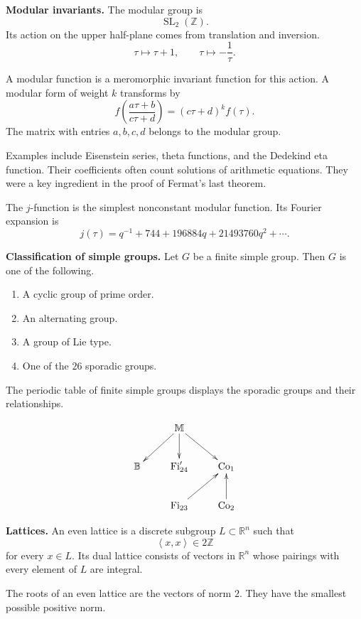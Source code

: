 \medskip\noindent
{\bf Modular invariants.}
The modular group is
$$
\operatorname{SL}_2(\mathbb{Z}).
$$
Its action on the upper half-plane comes from
translation and inversion.
$$
\tau\longmapsto\tau+1,
\qquad
\tau\longmapsto-\frac{1}{\tau}.
$$

A modular function is a meromorphic invariant
function for this action. A modular form of
weight $k$ transforms by
$$
f\left(\frac{a\tau+b}{c\tau+d}\right)
=(c\tau+d)^k f(\tau).
$$
The matrix with entries $a,b,c,d$ belongs
to the modular group.

Examples include Eisenstein series, theta
functions, and the Dedekind eta function.
Their coefficients often count solutions of
arithmetic equations. They were a key
ingredient in the proof of Fermat's last
theorem.

The $j$-function is the simplest nonconstant
modular function. Its Fourier expansion is
$$
j(\tau)=q^{-1}+744+196884q
+21493760q^2+\cdots.
$$

\medskip\noindent
{\bf Classification of simple groups.}
Let $G$ be a finite simple group. Then $G$ is
one of the following.

\begin{enumerate}
\item
A cyclic group of prime order.

\item
An alternating group.

\item
A group of Lie type.

\item
One of the $26$ sporadic groups.
\end{enumerate}

The periodic table of finite simple groups
displays the sporadic groups and their
relationships.

$$
\xymatrix{
& \mathbb{M}\ar[dl]\ar[d]\ar[dr] & \\
\mathbb{B} &
\mathrm{Fi}_{24}' &
\mathrm{Co}_1 \\
& \mathrm{Fi}_{23}\ar[ur] &
\mathrm{Co}_2\ar[u]
}
$$

\medskip\noindent
{\bf Lattices.}
An even lattice is a discrete subgroup
$L\subset\mathbb{R}^n$ such that
$$
\left\langle{} x,x \right\rangle{}
\in2\mathbb{Z}
$$
for every $x\in L$. Its dual lattice consists
of vectors in $\mathbb{R}^n$ whose pairings
with every element of $L$ are integral.

The roots of an even lattice are the vectors
of norm $2$. They have the smallest possible
positive norm.

